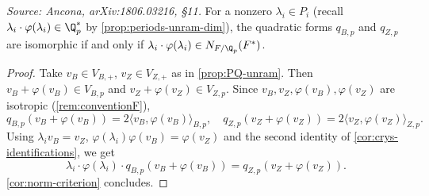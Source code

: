 \begin{proposition}
  \label{prop:iso-norm-unram}
  \textit{Source: Ancona, arXiv:1806.03216, \S11.}
  For a nonzero \(\lambda_i \in P_i\) (recall
  \(\lambda_i \cdot \varphi(\lambda_i) \in \Q_p^*\) by
  \cref{prop:periods-unram-dim}), the quadratic forms \(q_{B,p}\) and
  \(q_{Z,p}\) are isomorphic if and only if
  \(\lambda_i \cdot \varphi(\lambda_i) \in N_{F/\Q_p}(F^*)\).
\end{proposition}

\begin{proof}
  Take \(v_B \in V_{B,+}\), \(v_Z \in V_{Z,+}\) as in
  \cref{prop:PQ-unram}. Then \(v_B + \varphi(v_B) \in V_{B,p}\) and
  \(v_Z + \varphi(v_Z) \in V_{Z,p}\). Since \(v_B, v_Z, \varphi(v_B),
  \varphi(v_Z)\) are isotropic (\cref{rem:conventionF}),
  \[q_{B,p}(v_B + \varphi(v_B)) = 2\langle v_B, \varphi(v_B)\rangle_{B,p}, \quad
    q_{Z,p}(v_Z + \varphi(v_Z)) = 2\langle v_Z, \varphi(v_Z)\rangle_{Z,p}.\]
  Using \(\lambda_i v_B = v_Z\), \(\varphi(\lambda_i)\varphi(v_B) = \varphi(v_Z)\)
  and the second identity of \cref{cor:crys-identifications}, we get
  \[\lambda_i \cdot \varphi(\lambda_i) \cdot q_{B,p}(v_B + \varphi(v_B)) =
    q_{Z,p}(v_Z + \varphi(v_Z)).\]
  \cref{cor:norm-criterion} concludes.
\end{proof}

